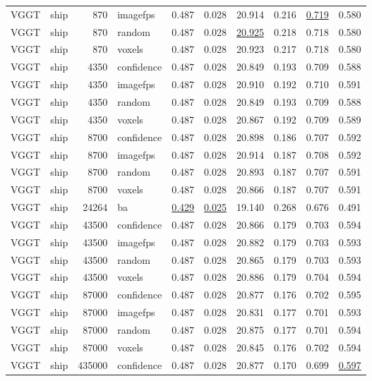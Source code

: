 \begin{table}[H]
\begin{tabular}{llrlrrrrrr}
VGGT & ship & 870 & imagefps & 0.487 & 0.028 & 20.914 & 0.216 & \underline{0.719} & 0.580 \\
VGGT & ship & 870 & random & 0.487 & 0.028 & \underline{20.925} & 0.218 & 0.718 & 0.580 \\
VGGT & ship & 870 & voxels & 0.487 & 0.028 & 20.923 & 0.217 & 0.718 & 0.580 \\
VGGT & ship & 4350 & confidence & 0.487 & 0.028 & 20.849 & 0.193 & 0.709 & 0.588 \\
VGGT & ship & 4350 & imagefps & 0.487 & 0.028 & 20.910 & 0.192 & 0.710 & 0.591 \\
VGGT & ship & 4350 & random & 0.487 & 0.028 & 20.849 & 0.193 & 0.709 & 0.588 \\
VGGT & ship & 4350 & voxels & 0.487 & 0.028 & 20.867 & 0.192 & 0.709 & 0.589 \\
VGGT & ship & 8700 & confidence & 0.487 & 0.028 & 20.898 & 0.186 & 0.707 & 0.592 \\
VGGT & ship & 8700 & imagefps & 0.487 & 0.028 & 20.914 & 0.187 & 0.708 & 0.592 \\
VGGT & ship & 8700 & random & 0.487 & 0.028 & 20.893 & 0.187 & 0.707 & 0.591 \\
VGGT & ship & 8700 & voxels & 0.487 & 0.028 & 20.866 & 0.187 & 0.707 & 0.591 \\
VGGT & ship & 24264 & ba & \underline{0.429} & \underline{0.025} & 19.140 & 0.268 & 0.676 & 0.491 \\
VGGT & ship & 43500 & confidence & 0.487 & 0.028 & 20.866 & 0.179 & 0.703 & 0.594 \\
VGGT & ship & 43500 & imagefps & 0.487 & 0.028 & 20.882 & 0.179 & 0.703 & 0.593 \\
VGGT & ship & 43500 & random & 0.487 & 0.028 & 20.865 & 0.179 & 0.703 & 0.593 \\
VGGT & ship & 43500 & voxels & 0.487 & 0.028 & 20.886 & 0.179 & 0.704 & 0.594 \\
VGGT & ship & 87000 & confidence & 0.487 & 0.028 & 20.877 & 0.176 & 0.702 & 0.595 \\
VGGT & ship & 87000 & imagefps & 0.487 & 0.028 & 20.831 & 0.177 & 0.701 & 0.593 \\
VGGT & ship & 87000 & random & 0.487 & 0.028 & 20.875 & 0.177 & 0.701 & 0.594 \\
VGGT & ship & 87000 & voxels & 0.487 & 0.028 & 20.845 & 0.176 & 0.702 & 0.594 \\
VGGT & ship & 435000 & confidence & 0.487 & 0.028 & 20.877 & 0.170 & 0.699 & \underline{0.597} \\

\end{tabular}
\end{table}
